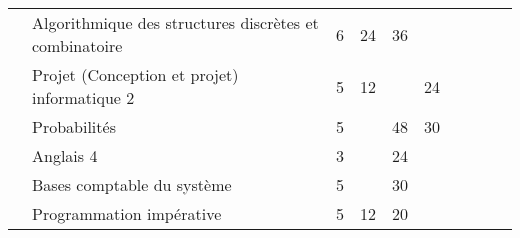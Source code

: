 \begin{tabular}{c|m{6cm}|cm{1cm}|cm{1cm}|cm{1cm}|cm{1cm}|}
 & \color{black} \mbox{Algorithmique} \mbox{des} \mbox{structures} \mbox{discrètes} \mbox{et} \mbox{combinatoire}  & \color{black} 6 & \color{black} 24 & \color{black} 36 & \color{black}  \\ \cline{2-6}
 & \cellcolor{couleurClaire} \color{couleurTexte} \mbox{Projet} \mbox{(Conception} \mbox{et} \mbox{projet)} \mbox{informatique} \mbox{2}  & \cellcolor{couleurClaire} \color{couleurTexte} 5 & \cellcolor{couleurClaire} \color{couleurTexte} 12 & \cellcolor{couleurClaire} \color{couleurTexte}  & \cellcolor{couleurClaire} \color{couleurTexte} 24 \\ \cline{2-6}
 & \color{black} \mbox{Probabilités}  & \color{black} 5 & \color{black}  & \color{black} 48 & \color{black} 30 \\ \cline{2-6}
 & \cellcolor{couleurClaire} \color{couleurTexte} \mbox{Anglais} \mbox{4}  & \cellcolor{couleurClaire} \color{couleurTexte} 3 & \cellcolor{couleurClaire} \color{couleurTexte}  & \cellcolor{couleurClaire} \color{couleurTexte} 24 & \cellcolor{couleurClaire} \color{couleurTexte}  \\ \cline{2-6}
 & \color{black} \mbox{Bases} \mbox{comptable} \mbox{du} \mbox{système}  & \color{black} 5 & \color{black}  & \color{black} 30 & \color{black}  \\ \cline{2-6}
 & \cellcolor{couleurClaire} \color{couleurTexte} \mbox{Programmation} \mbox{impérative}  & \cellcolor{couleurClaire} \color{couleurTexte} 5 & \cellcolor{couleurClaire} \color{couleurTexte} 12 & \cellcolor{couleurClaire} \color{couleurTexte} 20 & \cellcolor{couleurClaire} \color{couleurTexte}  \\ \cline{2-6}
\hline
\end{tabular}
